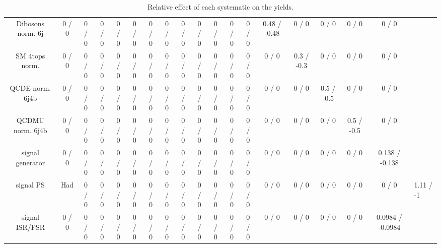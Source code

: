 \documentclass[10pt]{article}
\begin{document}
\begin{table}[htbp]
\begin{center}
\begin{tabular}{|c|c|c|c|c|c|c|c|c|c|c|c|c|c|c|c|c|c|}
  Dibosons norm. 6j & 0 / 0 & 0 / 0 & 0 / 0 & 0 / 0 & 0 / 0 & 0 / 0 & 0 / 0 & 0 / 0 & 0 / 0 & 0 / 0 & 0 / 0 & 0 / 0 & 0.48 / -0.48 & 0 / 0 & 0 / 0 & 0 / 0 & 0 / 0 \\ 
  SM 4tops norm. & 0 / 0 & 0 / 0 & 0 / 0 & 0 / 0 & 0 / 0 & 0 / 0 & 0 / 0 & 0 / 0 & 0 / 0 & 0 / 0 & 0 / 0 & 0 / 0 & 0 / 0 & 0.3 / -0.3 & 0 / 0 & 0 / 0 & 0 / 0 \\ 
  QCDE norm. 6j4b & 0 / 0 & 0 / 0 & 0 / 0 & 0 / 0 & 0 / 0 & 0 / 0 & 0 / 0 & 0 / 0 & 0 / 0 & 0 / 0 & 0 / 0 & 0 / 0 & 0 / 0 & 0 / 0 & 0.5 / -0.5 & 0 / 0 & 0 / 0 \\ 
  QCDMU norm. 6j4b & 0 / 0 & 0 / 0 & 0 / 0 & 0 / 0 & 0 / 0 & 0 / 0 & 0 / 0 & 0 / 0 & 0 / 0 & 0 / 0 & 0 / 0 & 0 / 0 & 0 / 0 & 0 / 0 & 0 / 0 & 0.5 / -0.5 & 0 / 0 \\ 
  signal generator & 0 / 0 & 0 / 0 & 0 / 0 & 0 / 0 & 0 / 0 & 0 / 0 & 0 / 0 & 0 / 0 & 0 / 0 & 0 / 0 & 0 / 0 & 0 / 0 & 0 / 0 & 0 / 0 & 0 / 0 & 0 / 0 & 0.138 / -0.138 \\ 
  signal PS & Had & 0 / 0 & 0 / 0 & 0 / 0 & 0 / 0 & 0 / 0 & 0 / 0 & 0 / 0 & 0 / 0 & 0 / 0 & 0 / 0 & 0 / 0 & 0 / 0 & 0 / 0 & 0 / 0 & 0 / 0 & 0 / 0 & 1.11 / -1 \\ 
  signal ISR/FSR & 0 / 0 & 0 / 0 & 0 / 0 & 0 / 0 & 0 / 0 & 0 / 0 & 0 / 0 & 0 / 0 & 0 / 0 & 0 / 0 & 0 / 0 & 0 / 0 & 0 / 0 & 0 / 0 & 0 / 0 & 0 / 0 & 0.0984 / -0.0984 \\ 
\hline 
\end{tabular} 
\caption{Relative effect of each systematic on the yields.} 
\end{center} 
\end{table} 
\end{document}
